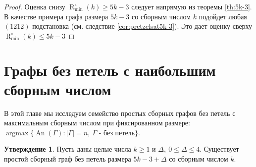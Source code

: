 \documentclass{article}
\theoremstyle{definition}
\newtheorem{conjecture}[theorem]{Утверждение}
\newcommand{\An}{\operatorname{An}}
\newcommand{\D}{\Delta}
\newcommand{\Romin}{\operatorname{R}_{\min}^\circ}
\begin{document}
\begin{proof}
    Оценка снизу $\Romin(k) \geq 5k - 3$ следует напрямую из теоремы \ref{th:5k-3}. В качестве примера графа размера $5k - 3$ со сборным числом $k$ подойдет любая $(1212)$-подстановка (см. следствие \ref{cor:pretzelsat5k-3}). Это дает оценку сверху $\Romin(k) \leq 5k - 3$
\end{proof}

\section{Графы без петель с наибольшим сборным числом}\label{sec:max-an}

В этой главе мы исследуем семейство простых сборных графов без петель с максимальным сборным числом при фиксированном размере: $\operatorname{argmax}\{\An(\Gamma) : |\Gamma| = n,\ \Gamma \text{ - без петель}\}$.

\begin{conjecture}
    Пусть даны целые числа $k \geq 1$ и $\D, \ 0 \leq \D \leq 4$. Существует простой сборный граф без петель размера $5k - 3 + \D$ со сборным числом $k$.
\end{conjecture}
\end{document}
